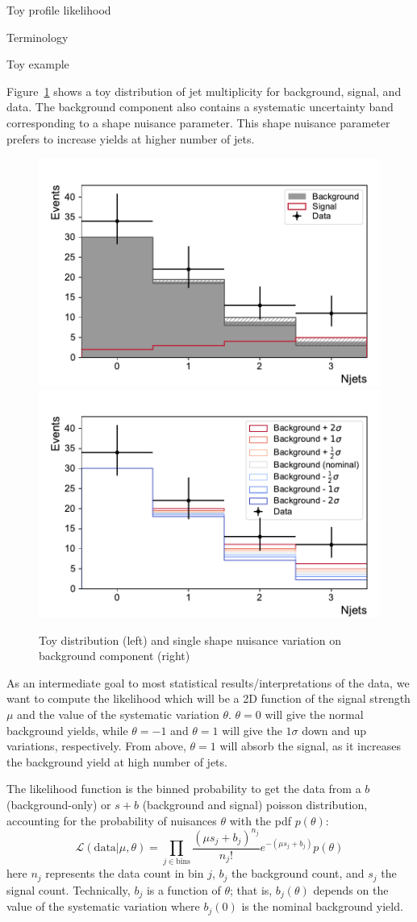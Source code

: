 \begin{section}{Toy profile likelihood}
\begin{subsection}{Terminology}
\end{subsection}

\begin{subsection}{Toy example}

Figure~\ref{fig:toystat:njets} shows a toy distribution of jet multiplicity
for background, signal, and data. The background component also contains a
systematic uncertainty band corresponding to a shape nuisance parameter.
This shape nuisance parameter prefers to increase yields at higher number of jets.

\begin{figure}[!htb]
    \centering
    \includegraphics[width=0.48\linewidth]{figs/toy_statistics/njets.pdf}
    \includegraphics[width=0.48\linewidth]{figs/toy_statistics/backgroundvariations.pdf}
    \caption{
Toy distribution (left) and single shape nuisance variation on background component (right)
    }
    \label{fig:toystat:njets}
\end{figure}
    
As an intermediate goal to most statistical results/interpretations of the data,
we want to compute the likelihood which will be a 2D function of the
signal strength $\mu$ and the value of the systematic variation
$\theta$. $\theta=0$ will give the normal background yields, while
$\theta=-1$ and $\theta=1$ will give the $1\sigma$ down and up
variations, respectively. From above, $\theta=1$ will absorb
 the signal, as it increases the background yield at high number of
jets.

The likelihood function is the binned probability to get the data from a
$b$ (background-only) or $s+b$ (background and signal) poisson distribution, 
accounting for the probability of nuisances $\theta$ with the pdf $p(\theta)$:
\begin{equation}
\mathcal{L}(\mathrm{data}|\mu,\theta)=\prod_{j\in\mathrm{bins}}
\frac{(\mu s_j + b_j)^{n_j}}{n_j!}
e^{-(\mu s_j + b_j)}
p(\theta)
\end{equation}
 here $n_j$ represents the data count in bin $j$, $b_j$ the
background count, and $s_j$ the signal count. Technically, $b_j$ is
a function of $\theta$; that is, $b_j(\theta)$ depends on the value
of the systematic variation where $b_j(0)$ is the nominal background
yield.


\end{subsection}
\end{section}
